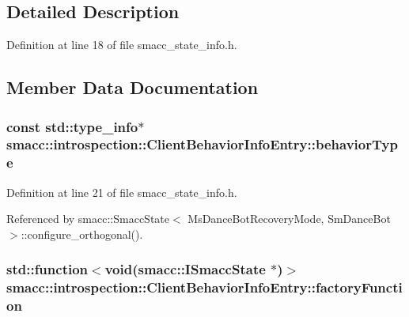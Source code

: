 \subsection{Detailed Description}


Definition at line 18 of file smacc\+\_\+state\+\_\+info.\+h.



\subsection{Member Data Documentation}
\subsubsection[{\texorpdfstring{behavior\+Type}{behaviorType}}]{\setlength{\rightskip}{0pt plus 5cm}const std\+::type\+\_\+info$\ast$ smacc\+::introspection\+::\+Client\+Behavior\+Info\+Entry\+::behavior\+Type}\hypertarget{structsmacc_1_1introspection_1_1ClientBehaviorInfoEntry_a11156213a771b7801ae69698de326e44}{}\label{structsmacc_1_1introspection_1_1ClientBehaviorInfoEntry_a11156213a771b7801ae69698de326e44}


Definition at line 21 of file smacc\+\_\+state\+\_\+info.\+h.



Referenced by smacc\+::\+Smacc\+State$<$ Ms\+Dance\+Bot\+Recovery\+Mode, Sm\+Dance\+Bot $>$\+::configure\+\_\+orthogonal().

\subsubsection[{\texorpdfstring{factory\+Function}{factoryFunction}}]{\setlength{\rightskip}{0pt plus 5cm}std\+::function$<$void({\bf smacc\+::\+I\+Smacc\+State} $\ast$)$>$ smacc\+::introspection\+::\+Client\+Behavior\+Info\+Entry\+::factory\+Function}\hypertarget{structsmacc_1_1introspection_1_1ClientBehaviorInfoEntry_abb0863623802e0107c659e61931518f4}{}\label{structsmacc_1_1introspection_1_1ClientBehaviorInfoEntry_abb0863623802e0107c659e61931518f4}


